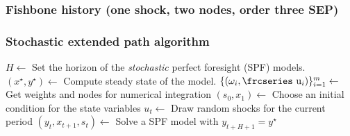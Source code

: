 \documentclass[handout,usepdftitle=false,xcolor=dvipsnames,aspectratio=169]{beamer}
\newcommand{\textfrc}[1]{{\frcseries#1}}
\newcommand{\mathfrc}[1]{\text{\textfrc{#1}}}
\begin{document}
\begin{frame}
  \frametitle{Fishbone history (one shock, two nodes, order three SEP)}
  \begin{center}
  \end{center}
\end{frame}


\begin{frame}
  \frametitle{Stochastic extended path algorithm}
  \begin{algorithm}[H]
    \caption{Stochastic Extended path algorithm}
    \label{alg:ep}
    \begin{algorithmic}[1]
      \STATE $H \leftarrow$ Set the horizon of the \emph{stochastic} perfect foresight (SPF) models.
      \STATE $(x^\star, y^\star) \leftarrow$ Compute steady state of the model.
      \STATE $\{(\omega_i,\mathfrc u_i)\}_{i=1}^m \leftarrow$ Get weights and nodes for numerical integration
      \STATE $(s_0, x_1) \leftarrow$ Choose an initial condition for the state variables
      \STATE $u_t  \leftarrow$ Draw random shocks for the current period
      \STATE $(y_t,x_{t+1},s_t) \leftarrow$ Solve a SPF model with $y_{t+H+1}=y^{\star}$
      \ENDFOR
    \end{algorithmic}
  \end{algorithm}
\end{frame}
\end{document}
